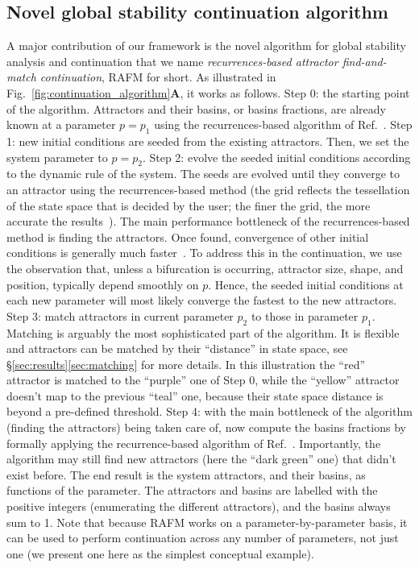 \documentclass[9pt,twocolumn,twoside,lineno]{pnas-new}
\begin{document}
\subsection{Novel global stability continuation algorithm}
\label{sec:recurrences_continuation}
A major contribution of our framework is the novel algorithm for global stability analysis and continuation that we name \emph{recurrences-based attractor find-and-match continuation}, RAFM for short. As illustrated in Fig.~\ref{fig:continuation_algorithm}\textbf{A}, it works as follows.
Step 0: the starting point of the algorithm. Attractors and their basins, or basins fractions, are already known at a parameter $p=p_1$ using the recurrences-based algorithm of Ref.~\cite{DatserisWagemakers2022}. 
Step 1: new initial conditions are seeded from the existing attractors. Then, we set the system parameter to $p=p_2$. 
Step 2: evolve the seeded initial conditions according to the dynamic rule of the system. The seeds are evolved until they converge to an attractor using the recurrences-based method (the grid reflects the tessellation of the state space that is decided by the user; the finer the grid, the more accurate the results~\cite{DatserisWagemakers2022}). 
The main performance bottleneck of the recurrences-based method is finding the attractors. Once found, convergence of other initial conditions is generally much faster~\cite{DatserisWagemakers2022}. To address this in the continuation, we use the observation that, unless a bifurcation is occurring, attractor size, shape, and position, typically depend smoothly on $p$. Hence, the seeded initial conditions at each new parameter will most likely converge the fastest to the new attractors.
Step 3: match attractors in current parameter $p_2$ to those in parameter $p_1$. Matching is arguably the most sophisticated part of the algorithm. It is flexible and attractors can be matched by their ``distance'' in state space, see \S\ref{sec:results}\ref{sec:matching} for more details. In this illustration the ``red'' attractor is matched to the ``purple'' one of Step 0, while the ``yellow'' attractor doesn't map to the previous ``teal'' one, because their state space distance is beyond a pre-defined threshold.
Step 4: with the main bottleneck of the algorithm (finding the attractors) being taken care of, now compute the basins fractions by formally applying the recurrence-based algorithm of Ref.~\cite{DatserisWagemakers2022}. Importantly, the algorithm may still find new attractors (here the ``dark green'' one) that didn't exist before. The end result is the system attractors, and their basins, as functions of the parameter. The attractors and basins are labelled with the positive integers (enumerating the different attractors), and the basins always sum to 1.
Note that because RAFM works on a parameter-by-parameter basis, it can be used to perform continuation across any number of parameters, not just one (we present one here as the simplest conceptual example).
\end{document}
